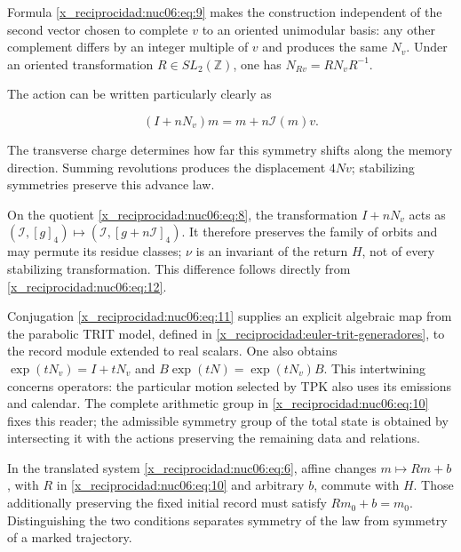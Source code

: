 Formula \eqref{x_reciprocidad:nuc06:eq:9} makes the construction independent of the second vector chosen to complete \(v\) to an oriented unimodular basis: any other complement differs by an integer multiple of \(v\) and produces the same \(N_v\). Under an oriented transformation \(R\in SL_2(\mathbb Z)\), one has \(N_{Rv}=RN_vR^{-1}\).

The action can be written particularly clearly as

\begin{equation}
(I+nN_v)m=m+n\mathcal I(m)v.
\label{x_reciprocidad:nuc06:eq:12}
\end{equation}

The transverse charge determines how far this symmetry shifts along the memory direction. Summing revolutions produces the displacement \(4Nv\); stabilizing symmetries preserve this advance law.

On the quotient \eqref{x_reciprocidad:nuc06:eq:8}, the transformation \(I+nN_v\) acts as \((\mathcal I,[g]_4)\mapsto(\mathcal I,[g+n\mathcal I]_4)\). It therefore preserves the family of orbits and may permute its residue classes; \(\nu\) is an invariant of the return \(H\), not of every stabilizing transformation. This difference follows directly from \eqref{x_reciprocidad:nuc06:eq:12}.

Conjugation \eqref{x_reciprocidad:nuc06:eq:11} supplies an explicit algebraic map from the parabolic TRIT model, defined in \cref{x_reciprocidad:euler-trit-generadores}, to the record module extended to real scalars. One also obtains \(\exp(tN_v)=I+tN_v\) and \(B\exp(tN)=\exp(tN_v)B\). This intertwining concerns operators: the particular motion selected by TPK also uses its emissions and calendar. The complete arithmetic group in \eqref{x_reciprocidad:nuc06:eq:10} fixes this reader; the admissible symmetry group of the total state is obtained by intersecting it with the actions preserving the remaining data and relations.

In the translated system \eqref{x_reciprocidad:nuc06:eq:6}, affine changes \(m\mapsto Rm+b\), with \(R\) in \eqref{x_reciprocidad:nuc06:eq:10} and arbitrary \(b\), commute with \(H\). Those additionally preserving the fixed initial record must satisfy \(Rm_0+b=m_0\). Distinguishing the two conditions separates symmetry of the law from symmetry of a marked trajectory.

